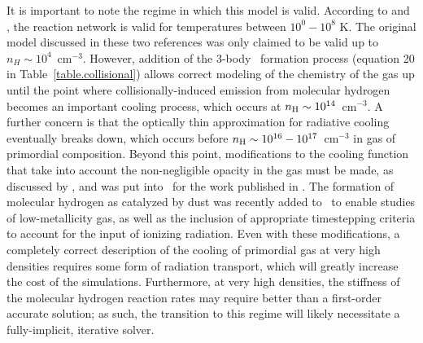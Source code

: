 It is important to note the regime in which this model is valid.
According to \citet{abel97} and \citet{anninos97},
the reaction network is valid for temperatures between $10^0 - 10^8$
K.  The original model discussed in these two references was only claimed to be valid
up to $n_H \sim 10^4$~cm$^{-3}$.  However, addition of the 3-body
\HH~formation process (equation 20 in Table~\ref{table.collisional})
allows correct modeling of the chemistry of the gas up until the point
where collisionally-induced emission from molecular hydrogen becomes
an important cooling process, which occurs at $n_{\rm H} \sim
10^{14}$~cm$^{-3}$.  A further concern is that the optically thin
approximation for radiative cooling eventually breaks down, which occurs before
$n_{\rm H} \sim 10^{16} - 10^{17}$~cm$^{-3}$ in gas of primordial composition.  Beyond this point,
modifications to the cooling function that take into account the
non-negligible opacity in the gas must be made, as discussed by
\citet{2004MNRAS.348.1019R}, and was put into \enzo\ for the work
published in \citep{2009Sci...325..601T,2009PhDT.........5T}.   The formation
of molecular hydrogen as catalyzed by dust was recently added to \enzo\ to
enable studies of low-metallicity gas, as well as the inclusion of appropriate
timestepping criteria to account for the input of ionizing radiation.  Even
with these modifications, a completely correct description of the cooling of
primordial gas at very high densities requires some form of radiation
transport, which will greatly increase the cost of the simulations.
Furthermore, at very high densities, the stiffness of the molecular hydrogen
reaction rates may require better than a first-order accurate solution; as
such, the transition to this regime will likely necessitate a fully-implicit,
iterative solver.


